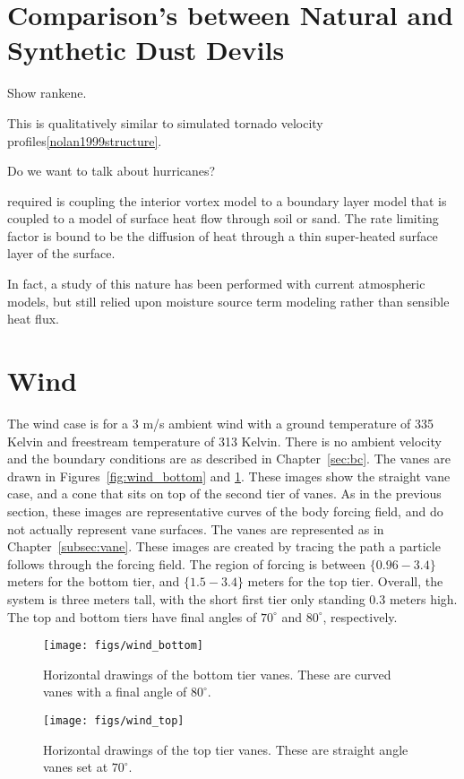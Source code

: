\section{Comparison's between Natural and Synthetic Dust Devils}

Show rankene. 

This is qualitatively similar to simulated tornado velocity
profiles\ref{nolan1999structure}. 


Do we want to talk about hurricanes?


 required is coupling the interior vortex model to a
 boundary layer model that is coupled to a model of surface heat flow
 through soil or sand. The rate limiting factor is bound to be the
 diffusion of heat through a thin super-heated surface layer of
 the surface\cite{emm_comm}.   

In fact, a study of this nature has been performed with current
atmospheric models\cite{emanuel2008hypothesis}, but still relied upon
moisture source term modeling rather than sensible heat flux.   

\section{Wind}

The wind case is for a 3 m/s ambient wind with a ground temperature of
335 Kelvin and freestream temperature of 313 Kelvin. There is no ambient
velocity and the boundary conditions are as described in
Chapter~\ref{sec:bc}. The vanes are drawn in
Figures~\ref{fig:wind_bottom} and \ref{fig:wind_top}. These images show
the straight vane case, and a cone that sits on top of the second tier of vanes. 
As in the previous section, these images are representative
curves of the body forcing field, and do not actually represent vane
surfaces. The vanes are represented as in Chapter~\ref{subsec:vane}. 
These images are created by tracing the path a particle follows through
the forcing field. The region of forcing is between $\{0.96-3.4\}$ meters
for the bottom tier, and $\{1.5-3.4\}$ meters for the top tier. Overall,
the system is three meters tall, with the short first tier only standing
0.3 meters high. The top and bottom tiers have final angles of
$70^{\circ}$ and $80^{\circ}$, respectively.

\begin{figure}[htb]
\centering
\begin{minipage}{0.45\textwidth}
\centering
 \texttt{[image: figs/wind\_bottom]}
 \caption{Horizontal drawings of the bottom tier vanes. These are curved 
 vanes with a final angle of $80^{\circ}$.}
 \label{fig:wind_bottom}  
\end{minipage}\hfill
\begin{minipage}{0.45\textwidth}
\centering
\texttt{[image: figs/wind\_top]}
\caption{Horizontal drawings of the top tier vanes. These are straight
 angle vanes set at $70^{\circ}$.} 
 \label{fig:wind_top}  
\end{minipage}
\end{figure}


